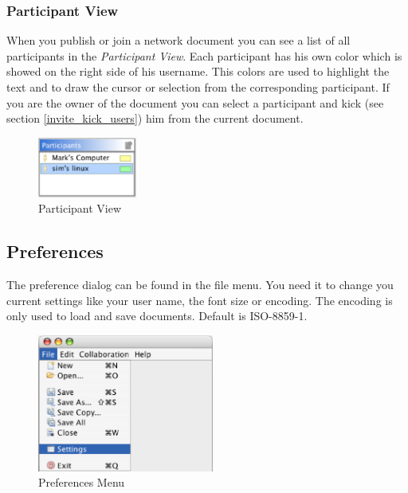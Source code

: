 \documentclass[11pt,a4paper]{article}
\begin{document}
\subsubsection{Participant View}
When you publish or join a network document you can see a list of all participants in the \textit{Participant View}. Each participant has his own color which is showed on the right side of his username. This colors are used to highlight the text and to draw the cursor or selection from the corresponding participant. If you are the owner of the document you can select a participant and kick (see section \ref{invite_kick_users}) him from the current document.

\begin{figure}[H]
\begin{center}
  \includegraphics[height=0.78in, width=1.28in]{../images/usermanual/pview_overview.eps}
\caption{Participant View}
\label{view_participant}
\end{center}
\end{figure}


\subsection{Preferences}
The preference dialog can be found in the file menu. You need it to change you current settings like your user name, the font size or encoding. The encoding is only used to load and save documents. Default is ISO-8859-1.

\begin{figure}[H]
\begin{center}
  \includegraphics[height=1.78in, width=2.28in]{../images/usermanual/menu_file_preferences.eps}
\caption{Preferences Menu}
\label{view_preferences_menu}
\end{center}
\end{figure}
\end{document}
